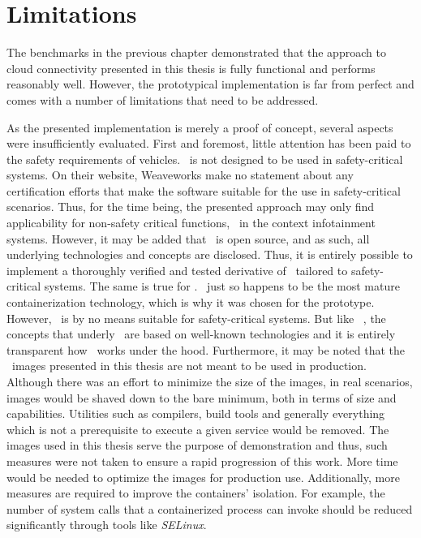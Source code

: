 %
%
%
%
%
%
%
%
%
%
\section{Limitations}
The benchmarks in the previous chapter demonstrated that the approach to cloud connectivity presented in this thesis is fully functional and performs reasonably well. However, the prototypical implementation is far from perfect and comes with a number of limitations that need to be addressed.

As the presented implementation is merely a proof of concept, several aspects were insufficiently evaluated. First and foremost, little attention has been paid to the safety requirements of vehicles. \wnet\ is not designed to be used in safety-critical systems. On their website, Weaveworks make no statement about any certification efforts that make the software suitable for the use in safety-critical scenarios. Thus, for the time being, the presented approach may only find applicability for non-safety critical functions, \eg\ in the context infotainment systems. However, it may be added that \wnet\ is open source, and as such, all underlying technologies and concepts are disclosed. Thus, it is entirely possible to implement a thoroughly verified and tested derivative of \wnet\ tailored to safety-critical systems.
The same is true for \docker . \docker\ just so happens to be the most mature containerization technology, which is why it was chosen for the prototype. However, \docker\ is by no means suitable for safety-critical systems. But like \wnet\ , the concepts that underly \docker\ are based on well-known technologies and it is entirely transparent how \docker\ works under the hood. Furthermore, it may be noted that the \docker\ images presented in this thesis are not meant to be used in production. Although there was an effort to minimize the size of the images, in real scenarios, images would be shaved down to the bare minimum, both in terms of size and capabilities. Utilities such as compilers, build tools and generally everything which is not a prerequisite to execute a given service would be removed. The images used in this thesis serve the purpose of demonstration and thus, such measures were not taken to ensure a rapid progression of this work. More time would be needed to optimize the images for production use. Additionally, more measures are required to improve the containers' isolation. For example, the number of system calls that a containerized process can invoke should be reduced significantly through tools like \emph{SELinux}.

